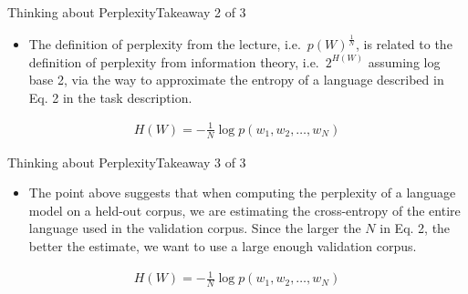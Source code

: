 \documentclass[t]{beamer}
\begin{document}
\begin{frame}{Thinking about Perplexity}{Takeaway 2 of 3}
    \begin{itemize}
        \item The definition of perplexity from the lecture, i.e.\
              $p(W)^{\frac{1}{N}}$, is related to the definition of perplexity
              from information theory, i.e.\ $2^{H(W)}$ assuming log base 2, via
              the way to approximate the entropy of a language described in
              Eq. 2 in the task description.
    \end{itemize}
    \begin{align*}
        H(W) = -\frac{1}{N} \log p(w_1,w_2,\ldots,w_N)
    \end{align*}
\end{frame}

\begin{frame}{Thinking about Perplexity}{Takeaway 3 of 3}
    \begin{itemize}
        \item The point above suggests that when computing the perplexity of a
              language model on a held-out corpus, we are estimating the
              cross-entropy of the entire language used in the validation
              corpus.
              Since the larger the $N$ in Eq. 2, the better the estimate, we
              want to use a large enough validation corpus.
    \end{itemize}
    \begin{align*}
        H(W) = -\frac{1}{N} \log p(w_1,w_2,\ldots,w_N)
    \end{align*}
\end{frame}
\end{document}
